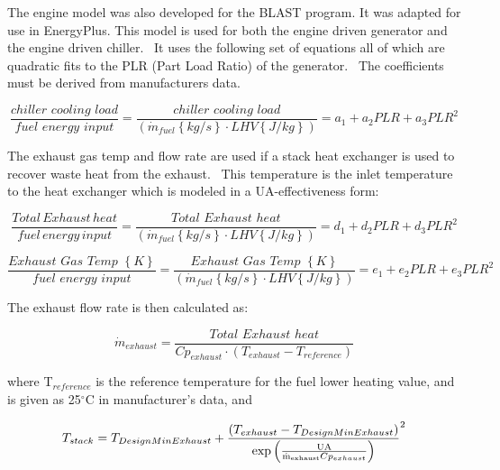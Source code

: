 The engine model was also developed for the BLAST program. It was adapted for use in EnergyPlus. This model is used for both the engine driven generator and the engine driven chiller.~ It uses the following set of equations all of which are quadratic fits to the PLR (Part Load Ratio) of the generator.~ The coefficients must be derived from manufacturers data.

\begin{equation}
\frac{{chiller\,\,cooling\,\,load}}{{fuel\,\,energy\,\,input}} = \frac{{chiller\,\,cooling\,\,load}}{{\left( {{{\dot m}_{fuel}}\left\{ {kg/s} \right\} \cdot LHV\left\{ {J/kg} \right\}} \right)}} = {a_1} + {a_2}PLR + {a_3}PL{R^2}
\end{equation}

The exhaust gas temp and flow rate are used if a stack heat exchanger is used to recover waste heat from the exhaust.~ This temperature is the inlet temperature to the heat exchanger which is modeled in a UA-effectiveness form:

\begin{equation}
\frac{{Total\,Exhaust\,heat}}{{fuel\,energy\,input}} = \frac{{Total\,\,Exhaust\,\,heat}}{{\left( {{{\dot m}_{fuel}}\left\{ {kg/s} \right\} \cdot LHV\left\{ {J/kg} \right\}} \right)}} = {d_1} + {d_2}PLR + {d_3}PL{R^2}
\end{equation}

\begin{equation}
\frac{{Exhaust\,\,Gas\,\,Temp\,\,\left\{ K \right\}}}{{fuel\,\,energy\,\,input}} = \frac{{Exhaust\,\,Gas\,\,Temp\,\,\left\{ K \right\}}}{{\left( {{{\dot m}_{fuel}}\left\{ {kg/s} \right\} \cdot LHV\left\{ {J/kg} \right\}} \right)}} = {e_1} + {e_2}PLR + {e_3}PL{R^2}
\end{equation}

The exhaust flow rate is then calculated as:

\begin{equation}
{\dot m_{exhaust}} = \frac{{Total\,\,Exhaust\,\,heat}}{{C{p_{exhaust}} \cdot \left( {{T_{exhaust}} - {T_{reference}}} \right)}}
\end{equation}

where T\(_{reference}\) is the reference temperature for the fuel lower heating value, and is given as 25\(^{\circ}\)C in manufacturer's data, and

\begin{equation}
{T_{stack}} = {T_{DesignMinExhaust}} + {\frac{{\left( {{T_{exhaust}} - {T_{DesignMinExhaust}}} \right)}}{{{\rm{exp}}\left( {\frac{{{\rm{UA}}}}{{{{{\rm{\dot m}}}_{{\rm{exhaust}}}}C{p_{exhaust}}}}} \right)}}^2}
\end{equation}


